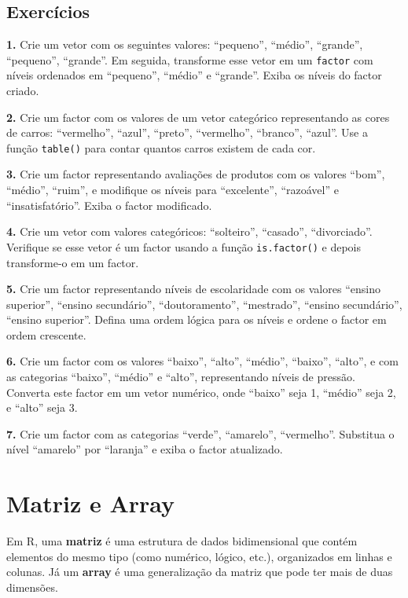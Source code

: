 \documentclass[
]{book}
\begin{document}
\subsection{Exercícios}\label{exercuxedcios-2}

\textbf{1.} Crie um vetor com os seguintes valores: ``pequeno'', ``médio'',
``grande'', ``pequeno'', ``grande''. Em seguida, transforme esse vetor em um
\texttt{factor} com níveis ordenados em ``pequeno'', ``médio'' e ``grande''. Exiba os
níveis do factor criado.

\textbf{2.} Crie um factor com os valores de um vetor categórico
representando as cores de carros: ``vermelho'', ``azul'', ``preto'',
``vermelho'', ``branco'', ``azul''. Use a função \texttt{table()} para contar quantos
carros existem de cada cor.

\textbf{3.} Crie um factor representando avaliações de produtos com os
valores ``bom'', ``médio'', ``ruim'', e modifique os níveis para ``excelente'',
``razoável'' e ``insatisfatório''. Exiba o factor modificado.

\textbf{4.} Crie um vetor com valores categóricos: ``solteiro'', ``casado'',
``divorciado''. Verifique se esse vetor é um factor usando a função
\texttt{is.factor()} e depois transforme-o em um factor.

\textbf{5.} Crie um factor representando níveis de escolaridade com os
valores ``ensino superior'', ``ensino secundário'', ``doutoramento'',
``mestrado'', ``ensino secundário'', ``ensino superior''. Defina uma ordem
lógica para os níveis e ordene o factor em ordem crescente.

\textbf{6.} Crie um factor com os valores ``baixo'', ``alto'', ``médio'', ``baixo'',
``alto'', e com as categorias ``baixo'', ``médio'' e ``alto'', representando
níveis de pressão. Converta este factor em um vetor numérico, onde
``baixo'' seja 1, ``médio'' seja 2, e ``alto'' seja 3.

\textbf{7.} Crie um factor com as categorias ``verde'', ``amarelo'', ``vermelho''.
Substitua o nível ``amarelo'' por ``laranja'' e exiba o factor atualizado.

\section{Matriz e Array}\label{matriz-e-array}

Em R, uma \textbf{matriz} é uma estrutura de dados bidimensional que contém
elementos do mesmo tipo (como numérico, lógico, etc.), organizados em
linhas e colunas. Já um \textbf{array} é uma generalização da matriz que pode
ter mais de duas dimensões.
\end{document}
